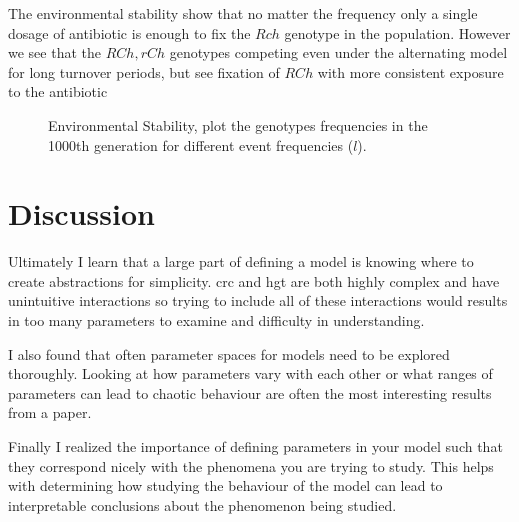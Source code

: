 \FloatBarrier
The environmental stability show that no matter the frequency only a single dosage of antibiotic is enough to fix the $Rch$ genotype in the population.
However we see that the $RCh,rCh$ genotypes competing even under the alternating model for long turnover periods, but see fixation of $RCh$ with more consistent exposure to the antibiotic
\FloatBarrier
\begin{figure}[htb!]
    \center
    \caption{Environmental Stability, plot the genotypes frequencies in the 1000th generation for different event frequencies ($l$).}
\end{figure}
\FloatBarrier

\section{Discussion}
Ultimately I learn that a large part of defining a model is knowing where to create abstractions for simplicity.
\ac{crc} and \ac{hgt} are both highly complex and have unintuitive interactions so trying to include all of these interactions would results in too many parameters to examine and difficulty in understanding.

I also found that often parameter spaces for models need to be explored thoroughly.
Looking at how parameters vary with each other or what ranges of parameters can lead to chaotic behaviour are often the most interesting results from a paper.

Finally I realized the importance of defining parameters in your model such that they correspond nicely with the phenomena you are trying to study.
This helps with determining how studying the behaviour of the model can lead to interpretable conclusions about the phenomenon being studied.

